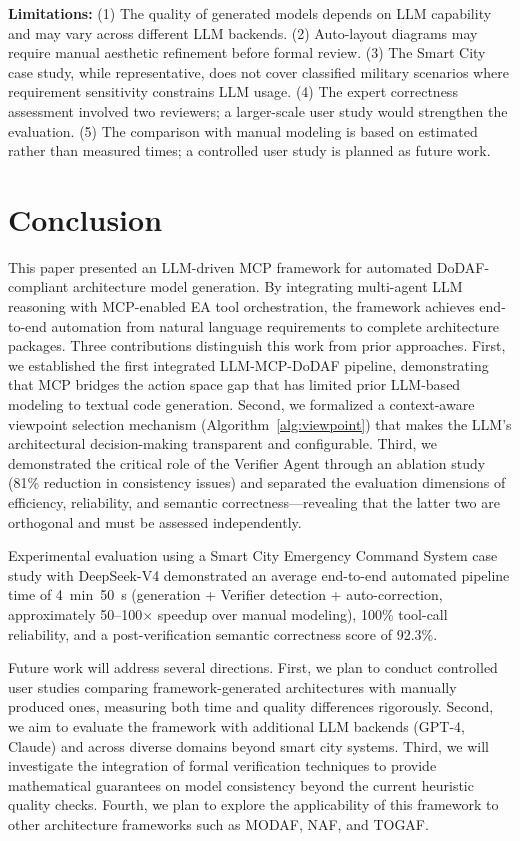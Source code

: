 \documentclass{ieeeaccess}
\begin{document}
\textbf{Limitations:} (1) The quality of generated models depends on LLM capability and may vary across different LLM backends. (2) Auto-layout diagrams may require manual aesthetic refinement before formal review. (3) The Smart City case study, while representative, does not cover classified military scenarios where requirement sensitivity constrains LLM usage. (4) The expert correctness assessment involved two reviewers; a larger-scale user study would strengthen the evaluation. (5) The comparison with manual modeling is based on estimated rather than measured times; a controlled user study is planned as future work.

\section{Conclusion}
\label{sec:conclusion}

This paper presented an LLM-driven MCP framework for automated DoDAF-compliant architecture model generation. By integrating multi-agent LLM reasoning with MCP-enabled EA tool orchestration, the framework achieves end-to-end automation from natural language requirements to complete architecture packages. Three contributions distinguish this work from prior approaches. First, we established the first integrated LLM-MCP-DoDAF pipeline, demonstrating that MCP bridges the action space gap that has limited prior LLM-based modeling to textual code generation. Second, we formalized a context-aware viewpoint selection mechanism (Algorithm~\ref{alg:viewpoint}) that makes the LLM's architectural decision-making transparent and configurable. Third, we demonstrated the critical role of the Verifier Agent through an ablation study (81\% reduction in consistency issues) and separated the evaluation dimensions of efficiency, reliability, and semantic correctness---revealing that the latter two are orthogonal and must be assessed independently.

Experimental evaluation using a Smart City Emergency Command System case study with DeepSeek-V4 demonstrated an average end-to-end automated pipeline time of 4~min~50~s (generation + Verifier detection + auto-correction, approximately 50--100$\times$ speedup over manual modeling), 100\% tool-call reliability, and a post-verification semantic correctness score of 92.3\%.

Future work will address several directions. First, we plan to conduct controlled user studies comparing framework-generated architectures with manually produced ones, measuring both time and quality differences rigorously. Second, we aim to evaluate the framework with additional LLM backends (GPT-4, Claude) and across diverse domains beyond smart city systems. Third, we will investigate the integration of formal verification techniques to provide mathematical guarantees on model consistency beyond the current heuristic quality checks. Fourth, we plan to explore the applicability of this framework to other architecture frameworks such as MODAF, NAF, and TOGAF.
\end{document}
